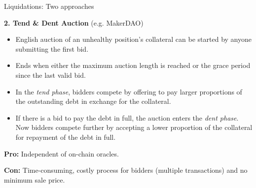 \documentclass[handout]{beamer}
\begin{document}
\begin{frame}{Liquidations: Two approaches }


\textbf{2. Tend \& Dent Auction} (e.g. MakerDAO)
\vspace{0.2em}
\begin{itemize}
\item English auction of an unhealthy position’s collateral can be started by anyone submitting the first bid.
\item Ends when either the maximum auction length is reached or the grace period since the last valid bid.
\item In the \emph{tend phase}, bidders compete by offering to pay larger proportions of the outstanding debt in exchange for the collateral.
\item If there is a bid to pay the debt in full, the auction enters the \textit{dent phase}. Now bidders compete further by accepting a lower proportion of the collateral for repayment of the debt in full.
\end{itemize}
\vspace{0.5em}

\textbf{Pro: }Independent of on-chain oracles.

\textbf{Con: }Time-consuming, costly process for bidders (multiple transactions) and no minimum sale price.


	
\end{frame}
\end{document}
